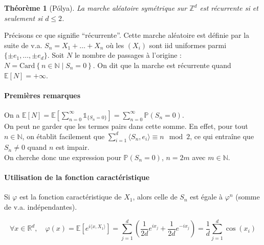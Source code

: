\documentclass[a4paper, 11pt]{article}
\def\Z{\mathbb{Z}}
\def\N{\mathbb{N}}
\def\P{\mathbb{P}}
\def\R{\mathbb{R}}
\def\E{\mathbb{E}}
\def\Indic{\mathbb{1}}
\newtheorem*{theorem}{Théorème}
\begin{document}
\begin{theorem}[Pólya]
  La marche aléatoire symétrique sur $\Z^d$ est \emph{récurrente} si et
  seulement si $d \leq 2$.
\end{theorem}

Précisons ce que signifie \enquote{récurrente}. Cette marche aléatoire est
définie par la suite de v.a. $S_n = X_1 + \ldots + X_n$ où les $(X_i)$ sont iid
uniformes parmi $\{\pm e_1, \ldots, \pm e_d\}$. Soit $N$ le nombre de passages à
l'origine : $N = \mathrm{Card}\left\{n \in \N \mid S_n = 0\right\}$. On dit que
la marche est récurrente quand $\E[N] = +\infty$.


\paragraph{Premières remarques} On a $\displaystyle \E[N] = \E\left[
  \sum_{n=0}^\infty \Indic_{\{S_n = 0\}} \right] =
\sum_{n=0}^\infty \P(S_n = 0)$.\\
On peut ne garder que les termes pairs dans cette somme. En effet, pour tout $n
\in \N$, on établit facilement que $\sum_{i=1}^d \langle S_n, e_i \rangle \equiv
n \mod 2$, ce qui entraîne que $S_n \neq 0$ quand $n$ est impair.\\
On cherche donc une expression pour $\P(S_n = 0)$, $n = 2m$ avec $m \in \N$.

\paragraph{Utilisation de la fonction caractéristique}

Si $\varphi$ est la fonction caractéristique de $X_1$, alors celle de $S_n$
est égale à $\varphi^n$ (somme de v.a. indépendantes).

\[ \forall x \in \R^d,\quad \varphi(x) = \E\left[ e^{i \langle x, X_1 \rangle}
  \right]
  = \sum_{j=1}^d \left( \frac{1}{2d}e^{ix_j} + \frac{1}{2d}e^{-ix_j}\right)
  = \frac{1}{d} \sum_{j=1}^d \cos(x_i) \]
\end{document}
